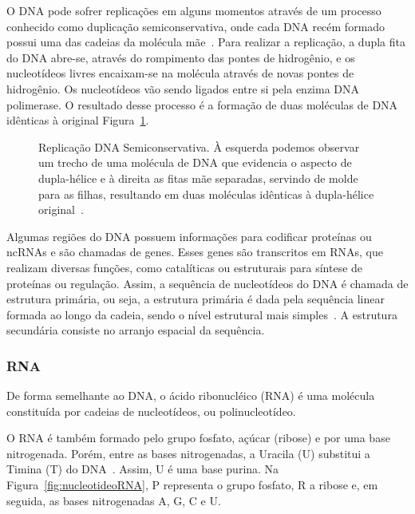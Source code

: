 O DNA pode sofrer replicações em alguns momentos através de um processo conhecido como duplicação semiconservativa, onde cada DNA recém formado possui uma das cadeias da molécula mãe~\citep{lopes:1998}.
Para realizar a replicação, a dupla fita do DNA abre-se, através do rompimento das pontes de hidrogênio, e os nucleotídeos livres encaixam-se na molécula através de novas pontes de hidrogênio. Os nucleotídeos vão sendo ligados entre si pela enzima DNA polimerase. O resultado desse processo é a formação de duas moléculas de DNA idênticas à original Figura~\ref{DNA-replicacao}.

\begin{figure}[ht]
\centering
{}
\caption{Replicação DNA Semiconservativa. À esquerda podemos observar um trecho de uma molécula de DNA que evidencia o aspecto de dupla-hélice e à direita as fitas mãe separadas, servindo de molde para as filhas, resultando em duas moléculas idênticas à dupla-hélice original~\citep{lodish:2005}. \label{DNA-replicacao}}
\end{figure}

Algumas regiões do DNA possuem informações para codificar proteínas ou ncRNAs e são chamadas de genes. Esses genes são transcritos em RNAs, que realizam diversas funções, como catalíticas ou estruturais para síntese de proteínas ou regulação. Assim, a sequência de nucleotídeos do DNA é chamada de estrutura primária, ou seja, a estrutura primária é dada pela sequência linear formada ao longo da cadeia, sendo o nível estrutural mais simples~\citep{lodish:2005}. A estrutura secundária consiste no arranjo espacial da sequência.


\subsubsection{RNA} \label{sec:RNA}

De forma semelhante ao DNA, o ácido ribonucléico (RNA) é uma molécula constituída por cadeias de nucleotídeos, ou polinucleotídeo.


O RNA é também formado pelo grupo fosfato, açúcar (ribose) e por uma base nitrogenada. Porém, entre as bases nitrogenadas, a Uracila (U) substitui a Timina (T) do DNA~\citep{lodish:2005}. Assim, U é uma base purina. Na Figura~\ref{fig:nucleotideoRNA}, P representa o grupo fosfato, R a ribose e, em seguida, as bases nitrogenadas A, G, C e U.

